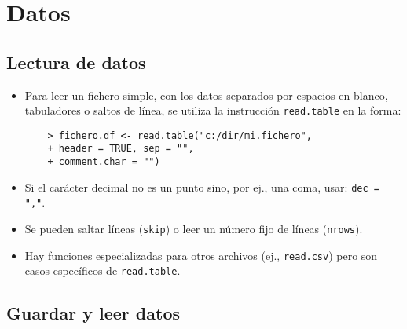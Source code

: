 \section{Datos}

\subsection{Lectura de datos}

\begin{itemize}
    \item Para leer un fichero simple, con los datos separados
    por espacios en blanco, tabuladores o saltos de línea, se
    utiliza la instrucción \verb"read.table" en la forma:
    \begin{verbatim}
    > fichero.df <- read.table("c:/dir/mi.fichero",
    + header = TRUE, sep = "",
    + comment.char = "")
    \end{verbatim}

    \item Si el carácter decimal no es un punto sino, por ej.,
    una coma, usar: \verb[dec = ","[.

    \item Se pueden saltar líneas (\verb"skip") o leer un número
    fijo de líneas (\verb"nrows").

    \item Hay funciones especializadas para otros archivos
    (ej., \verb"read.csv") pero son casos específicos de \verb"read.table".

\end{itemize}

\newslide

\subsection{Guardar y leer datos}

